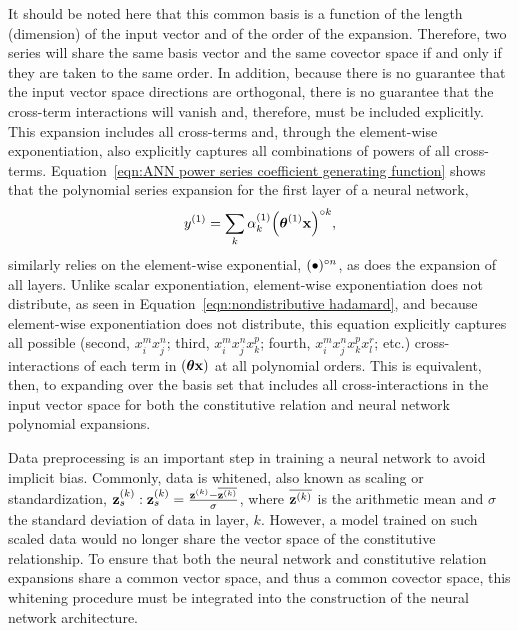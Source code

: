 It should be noted here that this common basis is a function of the length (dimension) of the input vector and of the order of the expansion. Therefore, two series will share the same basis vector and the same covector space if and only if they are taken to the same order. In addition, because there is no guarantee that the input vector space directions are orthogonal, there is no guarantee that the cross-term interactions will vanish and, therefore, must be included explicitly. This expansion includes all cross-terms and, through the element-wise exponentiation, also explicitly captures all combinations of powers of all cross-terms. Equation~\ref{eqn:ANN power series coefficient generating function} shows that the polynomial series expansion for the first layer of a neural network,
\[
    y^{(1)} = \sum_k \alpha^{(1)}_k \he[\left( \boldsymbol{\theta}^{(1)} {\bf x} \right)]{k},
\]
similarly relies on the element-wise exponential, $(\bullet)\he{n}$, as does the expansion of all layers. Unlike scalar exponentiation, element-wise exponentiation does not distribute, as seen in Equation~\ref{eqn:nondistributive hadamard}, and because element-wise exponentiation does not distribute, this equation explicitly captures all possible (second, $x_i^m x_j^n$; third, $x_i^m x_j^n x_k^p$; fourth, $x_i^m x_j^n x_k^p x_l^r$; etc.) cross-interactions of each term in $(\boldsymbol{\theta}{\bf x})$ at all polynomial orders. This is equivalent, then, to expanding over the basis set that includes all cross-interactions in the input vector space for both the constitutive relation and neural network polynomial expansions.

Data preprocessing is an important step in training a neural network to avoid implicit bias. Commonly, data is whitened, also known as scaling or standardization, ${\bf z}_s^{(k)}: {\bf z}_s^{(k)} = \frac{{\bf z}^{(k)} - \overline{{\bf z}^{(k)}}}{\sigma}$, where $\overline{{\bf z}^{(k)}}$ is the arithmetic mean and $\sigma$ the standard deviation of data in layer, $k$. However, a model trained on such scaled data would no longer share the vector space of the constitutive relationship. To ensure that both the neural network and constitutive relation expansions share a common vector space, and thus a common covector space, this whitening procedure must be integrated into the construction of the neural network architecture.

